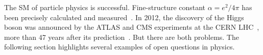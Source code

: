 

\label{sec:BSM}

The SM of particle physics is successful.
Fine-structure constant $\alpha=e^2/4\pi$ has been precisely calculated and measured~\cite{g-2_e_theory1,g-2_e_theory2,g-2_e_theory3,g-2_e_Cambridge1}.
In 2012, the discovery of the Higgs boson was announced by the ATLAS and CMS experiments at the CERN LHC~\cite{Higgs_discovery_2012_CMS,Higgs_discovery_2012_ATLAS,Higgs_discovery_2013_CMS,Higgs_mass_2015_combined}, more than 47 years after its prediction~\cite{Higgs_theory1,Higgs_theory2}.
But there are both problems.
The following section highlights several examples of open questions in physics.


